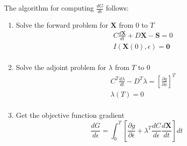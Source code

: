 \documentclass{tufte-handout}
\begin{document}
The algorithm for computing $ \frac{d G}{d\epsilon}$ follows:
\begin{enumerate}
	\item Solve the forward problem for $\mathbf{X}$ from $0$ to $T$
	\begin{equation*}
	\begin{aligned}
 \quad & C \frac{d \mathbf{X}}{dt} + D \mathbf{X} - \mathbf{S} = 0\\
	&I(\mathbf{X}(0),\epsilon) = \mathbf{0}   \\
	\end{aligned}
	\end{equation*}
	\item Solve the adjoint problem for $\lambda$ from $T$ to $0$
	\begin{equation*}
	\begin{aligned}
	\quad & C^T \frac{d \lambda }{dt} - D^T \lambda = \left[ \frac{\partial g}{\partial x}\right]^T \\
	&\lambda(T) = 0   \\
	\end{aligned}
	\end{equation*}
	\item Get the objective function gradient
	  \begin{equation*}\label{lag_graddd}
	  \frac{d G}{d\epsilon} = \int_{0}^{T} \left[  \frac{\partial g}{\partial \epsilon} + \lambda^T \frac{d C}{d \epsilon} \frac{d \mathbf{X}}{dt}  \right] dt 
	  \end{equation*}
\end{enumerate}
\end{document}
